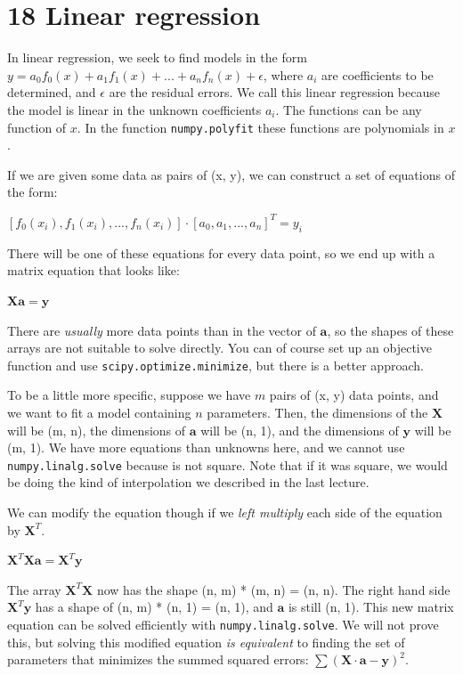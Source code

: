 \documentclass[11pt]{article}
\begin{document}
\section{18 Linear regression}
\label{sec:orgf76a173}

In linear regression, we seek to find models in the form \(y = a_{0} f_{0}(x) + a_{1} f_{1}(x) + ... + a_{n} f_{n}(x) + \epsilon\), where \(a_{i}\) are coefficients to be determined, and \(\epsilon\) are the residual errors. We call this linear regression because the model is linear in the unknown coefficients \(a_{i}\). The functions can be any function of \(x\). In the function \texttt{numpy.polyfit} these functions are polynomials in \(x\).

If we are given some data as pairs of (x, y), we can construct a set of equations of the form:

\([f_{0}(x_{i}), f_{1}(x_{i}), ..., f_{n}(x_{i})]\cdot[a_{0}, a_{1}, ...,  a_{n}]^T = y_{i}\)

There will be one of these equations for every data point, so we end up with a matrix equation that looks like:

\(\mathbf{X} \mathbf{a} = \mathbf{y}\)

There are \emph{usually} more data points than in the vector of \(\mathbf{a}\), so the shapes of these arrays are not suitable to solve directly. You can of course set up an objective function and use \texttt{scipy.optimize.minimize}, but there is a better approach.

To be a little more specific, suppose we have \(m\) pairs of (x, y) data points, and we want to fit a model containing \(n\) parameters. Then, the dimensions of the \(\mathbf{X}\) will be (m, n), the dimensions of \(\mathbf{a}\) will be (n, 1), and the dimensions of \(\mathbf{y}\) will be (m, 1).  We have more equations than unknowns here, and we cannot use \texttt{numpy.linalg.solve} because  is not square. Note that if it was square, we would be doing the kind of interpolation we described in the last lecture.

We can modify the equation though if we \emph{left multiply} each side of the equation by \(\mathbf{X}^T\).

\(\mathbf{X}^T \mathbf{X} \mathbf{a} = \mathbf{X}^T \mathbf{y}\)

The array \(\mathbf{X}^T \mathbf{X}\) now has the shape (n, m) * (m, n) = (n, n). The right hand side \(\mathbf{X}^T \mathbf{y}\) has a shape of (n, m) * (n, 1) = (n, 1), and \(\mathbf{a}\) is still (n, 1). This new matrix equation can be solved efficiently with \texttt{numpy.linalg.solve}. We will not prove this, but solving this modified equation \emph{is equivalent} to finding the set of parameters that minimizes the summed squared errors: \(\sum (\mathbf{X} \cdot \mathbf{a} - \mathbf{y})^2\).
\end{document}
